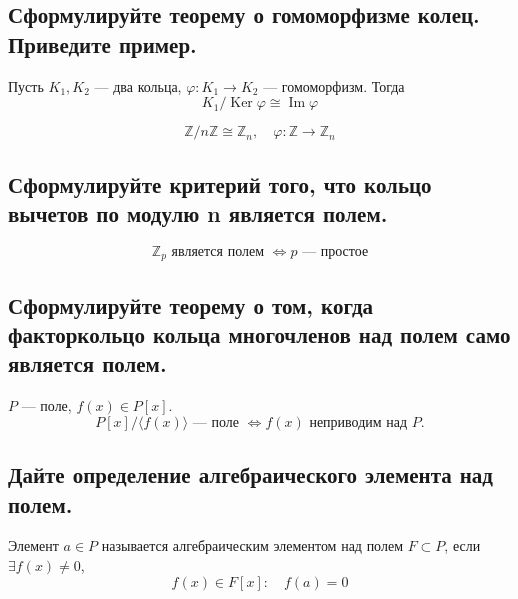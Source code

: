 \subsection{Сформулируйте теорему о гомоморфизме колец. Приведите пример.}

\begin{theorem}
    Пусть $K_1, K_2$ --- два кольца, $\varphi: K_1 \to K_2$ --- гомоморфизм. Тогда
    \[
        K_1 / \operatorname{Ker}\varphi \cong \operatorname{Im}\varphi
    \]
\end{theorem}

\begin{example}
    \[
        \mathbb{Z}/n\mathbb{Z} \cong \mathbb{Z}_n,\quad \varphi: \mathbb{Z} \to \mathbb{Z}_n
    \]
\end{example}


\subsection{Сформулируйте критерий того, что кольцо вычетов по модулю n является полем.}

\begin{theorem}
    \[
        \mathbb{Z}_p \text{ является полем } \Longleftrightarrow p \text{ --- простое}
    \]
\end{theorem}


\subsection{Сформулируйте теорему о том, когда факторкольцо кольца многочленов над полем само является полем.}

\begin{theorem}
    $P$ --- поле, $f(x) \in P[x]$.
    \[
        P[x] / \langle f(x) \rangle \text{ --- поле } \Longleftrightarrow f(x) \text{ неприводим над } P.
    \]
\end{theorem}


\subsection{Дайте определение алгебраического элемента над полем.}

\begin{definition}
    Элемент $a \in P$ называется алгебраическим элементом над полем $F \subset P$, если $\exists f(x) \neq 0$,
    \[
        f(x) \in F[x]:\quad f(a) = 0
    \]
\end{definition}


